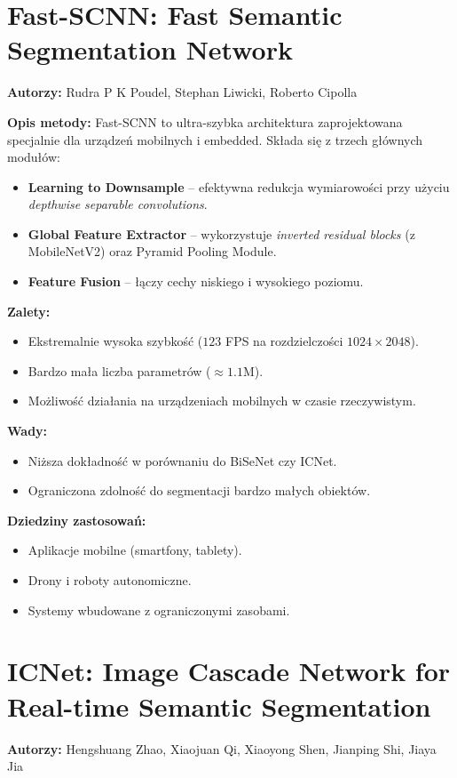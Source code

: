 \section{Fast-SCNN: Fast Semantic Segmentation Network}
\textbf{Autorzy:} Rudra P K Poudel, Stephan Liwicki, Roberto Cipolla

\textbf{Opis metody:}
Fast-SCNN to ultra-szybka architektura zaprojektowana specjalnie dla urządzeń mobilnych i embedded. Składa się z trzech głównych modułów:
\begin{itemize}
    \item \textbf{Learning to Downsample} -- efektywna redukcja wymiarowości przy użyciu \textit{depthwise separable convolutions}.
    \item \textbf{Global Feature Extractor} -- wykorzystuje \textit{inverted residual blocks} (z MobileNetV2) oraz Pyramid Pooling Module.
    \item \textbf{Feature Fusion} -- łączy cechy niskiego i wysokiego poziomu.
\end{itemize}

\textbf{Zalety:}
\begin{itemize}
    \item Ekstremalnie wysoka szybkość ($123$ FPS na rozdzielczości $1024\times2048$).
    \item Bardzo mała liczba parametrów ($\approx 1.1$M).
    \item Możliwość działania na urządzeniach mobilnych w czasie rzeczywistym.
\end{itemize}

\textbf{Wady:}
\begin{itemize}
    \item Niższa dokładność w porównaniu do BiSeNet czy ICNet.
    \item Ograniczona zdolność do segmentacji bardzo małych obiektów.
\end{itemize}

\textbf{Dziedziny zastosowań:}
\begin{itemize}
    \item Aplikacje mobilne (smartfony, tablety).
    \item Drony i roboty autonomiczne.
    \item Systemy wbudowane z ograniczonymi zasobami.
\end{itemize}

\section{ICNet: Image Cascade Network for Real-time Semantic Segmentation}
\textbf{Autorzy:} Hengshuang Zhao, Xiaojuan Qi, Xiaoyong Shen, Jianping Shi, Jiaya Jia


